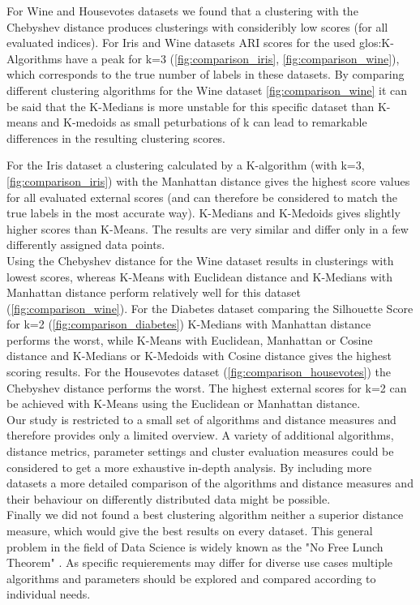 
For Wine and Housevotes datasets we found that a clustering with the Chebyshev distance produces clusterings with consideribly low scores (for all evaluated indices). 
For Iris and Wine datasets ARI scores for the used \Gls{glos:K-Algorithms} have a peak for k=3 (\autoref{fig:comparison_iris}, \autoref{fig:comparison_wine}), which corresponds to the true number of labels in these datasets.  
By comparing different clustering algorithms for the Wine dataset \autoref{fig:comparison_wine} it can be said that the K-Medians is more unstable for this specific dataset than K-means and K-medoids as small peturbations of k can lead to remarkable differences in the resulting clustering scores. 


For the Iris dataset a clustering calculated by a K-algorithm (with k=3, \autoref{fig:comparison_iris})  with the Manhattan distance gives the highest score values for all evaluated external scores (and can therefore be considered to match the true labels in the most accurate way). K-Medians and K-Medoids gives slightly higher scores than K-Means. The results are very similar and differ only in a few differently assigned data points. \\
Using the Chebyshev distance for the Wine dataset results in clusterings with lowest scores, whereas K-Means with Euclidean distance and K-Medians with Manhattan distance perform relatively well for this dataset (\autoref{fig:comparison_wine}).  
For the Diabetes dataset comparing the Silhouette Score for k=2 (\autoref{fig:comparison_diabetes}) K-Medians with Manhattan distance performs the worst, while K-Means with Euclidean, Manhattan or Cosine distance and K-Medians or K-Medoids with Cosine distance gives the highest scoring results. 
For the Housevotes dataset (\autoref{fig:comparison_housevotes}) the Chebyshev distance performs the worst. The highest external scores for k=2 can be achieved with K-Means using the Euclidean or Manhattan distance. \\

Our study is restricted to a small set of algorithms and distance measures and therefore provides only a limited overview. A variety of additional algorithms, distance metrics, parameter settings and cluster evaluation measures could be considered to get a more exhaustive in-depth analysis. By including more datasets a more detailed comparison of the algorithms and distance measures and their behaviour on differently distributed data might be possible. \\

Finally we did not found a best clustering algorithm neither a superior distance measure, which would give the best results on every dataset. This general problem in the field of Data Science is widely known as the "No Free Lunch Theorem" \cite{nofreelunch}. As specific requierements may differ for diverse use cases multiple algorithms and parameters should be explored and compared according to individual needs. 
